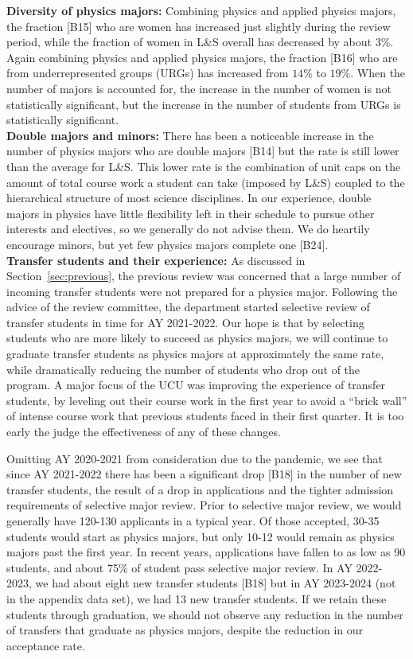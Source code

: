 \documentclass[12pt]{article}
\begin{document}
\noindent
{\bf Diversity of physics majors:} Combining physics and applied
physics majors, the fraction [B15] who are women has increased just
slightly during the review period, while the fraction of women in L\&S
overall has decreased by about $3\%$.  Again combining physics and
applied physics majors, the fraction [B16] who are from
underrepresented groups (URGs) has increased from $14\%$ to $19\%$.
When the number of majors is accounted for, the increase in the number
of women is not statistically significant, but the increase in the
number of students from URGs is statistically significant.\\[3pt]

\noindent
{\bf Double majors and minors:} There has been a noticeable increase
in the number of physics majors who are double majors [B14] but the
rate is still lower than the average for L\&S.  This lower rate is the
combination of unit caps on the amount of total course work a student
can take (imposed by L\&S) coupled to the hierarchical structure of
most science disciplines.  In our experience, double majors in physics
have little flexibility left in their schedule to pursue other
interests and electives, so we generally do not advise them.  We do
heartily encourage minors, but yet few physics majors complete one
[B24].\\[3pt]

\noindent
{\bf Transfer students and their experience:} As discussed in
Section~\ref{sec:previous}, the previous review was concerned that a
large number of incoming transfer students were not prepared for a
physics major.  Following the advice of the review committee, the
department started selective review of transfer students in time for
AY 2021-2022.  Our hope is that by selecting students who are more
likely to succeed as physics majors, we will continue to graduate
transfer students as physics majors at approximately the same rate,
while dramatically reducing the number of students who drop out of the
program.  A major focus of the UCU was improving the experience of
transfer students, by leveling out their course work in the first year
to avoid a ``brick wall'' of intense course work that previous
students faced in their first quarter.  It is too early the judge the
effectiveness of any of these changes.

Omitting AY 2020-2021 from consideration due to the pandemic, we see
that since AY 2021-2022 there has been a significant drop [B18] in the
number of new transfer students, the result of a drop in applications
and the tighter admission requirements of selective major review.
Prior to selective major review, we would generally have
120-130 applicants in a typical year.  Of those accepted, 30-35 students would
start as physics majors, but only 10-12 would remain as
physics majors past the first year.  In recent years, applications
have fallen to as low as 90 students, and about 75\% of
student pass selective major review.  In AY 2022-2023, we had about
eight new transfer students [B18] but in AY 2023-2024 (not in the
appendix data set), we had 13 new transfer students.  If we retain
these students through graduation, we should not observe any reduction in
the number of transfers that graduate as physics majors, despite the
reduction in our acceptance rate.
\end{document}
